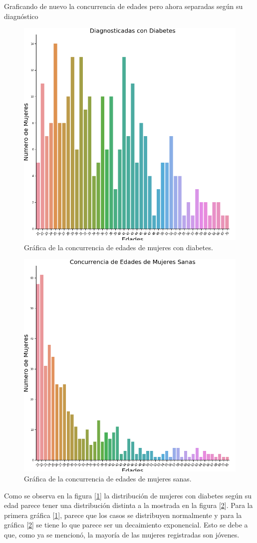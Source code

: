 \documentclass{article}
\begin{document}
Graficando de nuevo la concurrencia de edades pero ahora separadas según su diagnóstico

\begin{figure}[H]
	\centering
	\includegraphics[width=0.65\linewidth]{edad_diabetes.png}
	\caption{Gráfica de la concurrencia de edades de mujeres con diabetes.}%
	\label{fig:edad_diabetes}
\end{figure}

\begin{figure}[H]
	\centering
	\includegraphics[width=0.65\linewidth]{edad_no_diabetes.png}
	\caption{Gráfica de la concurrencia de edades de mujeres sanas.}%
	\label{fig:edad_no_diabetes}
\end{figure}

Como se observa en la figura [\ref{fig:edad_diabetes}] la distribución de mujeres con diabetes según su edad parece tener una distribución distinta a la mostrada en la figura [\ref{fig:edad_no_diabetes}]. Para la primera gráfica [\ref{fig:edad_diabetes}], parece que los casos se distribuyen normalmente\cite{Distro_normal} y para la gráfica [\ref{fig:edad_no_diabetes}] se tiene lo que parece ser un decaimiento exponencial. Esto se debe a que, como ya se mencionó, la mayoría de las mujeres registradas son jóvenes.
\end{document}
